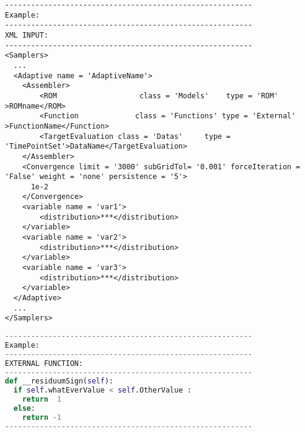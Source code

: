\begin{lstlisting}[style=XML]
---------------------------------------------------------
Example:
---------------------------------------------------------
XML INPUT:
--------------------------------------------------------- 
<Samplers>
  ...
  <Adaptive name = 'AdaptiveName'>
    <Assembler>
        <ROM                   class = 'Models'    type = 'ROM'            >ROMname</ROM>
        <Function             class = 'Functions' type = 'External'      >FunctionName</Function>
        <TargetEvaluation class = 'Datas'     type = 'TimePointSet'>DataName</TargetEvaluation>
    </Assembler>
    <Convergence limit = '3000' subGridTol= '0.001' forceIteration = 'False' weight = 'none' persistence = '5'>
      1e-2
    </Convergence>
    <variable name = 'var1'>
        <distribution>***</distribution>
    </variable>
    <variable name = 'var2'>
        <distribution>***</distribution>
    </variable>
    <variable name = 'var3'>
        <distribution>***</distribution>
    </variable>
  </Adaptive>
  ...
</Samplers>
\end{lstlisting} 
\begin{lstlisting}[language=python]
---------------------------------------------------------
Example:
---------------------------------------------------------
EXTERNAL FUNCTION:
---------------------------------------------------------
def __residuumSign(self):
  if self.whatEverValue < self.OtherValue : 
    return  1
  else: 
    return -1
---------------------------------------------------------
\end{lstlisting} 


